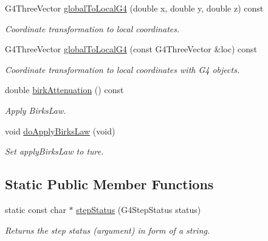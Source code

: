 \begin{DoxyCompactItemize}
G4ThreeVector \hyperlink{class_d_d4hep_1_1_simulation_1_1_geant4_step_handler_ad08f4724ef8345d764de6313d1e121fa}{globalToLocalG4} (double x, double y, double z) const 
\begin{DoxyCompactList}\small\item\em Coordinate transformation to local coordinates. \item\end{DoxyCompactList}\item 
G4ThreeVector \hyperlink{class_d_d4hep_1_1_simulation_1_1_geant4_step_handler_a1a0e03eb5215e033eb98538e6c963d6f}{globalToLocalG4} (const G4ThreeVector \&loc) const 
\begin{DoxyCompactList}\small\item\em Coordinate transformation to local coordinates with G4 objects. \item\end{DoxyCompactList}\item 
double \hyperlink{class_d_d4hep_1_1_simulation_1_1_geant4_step_handler_a35dae8faec24cfac1914db2e73c55bb2}{birkAttenuation} () const 
\begin{DoxyCompactList}\small\item\em Apply BirksLaw. \item\end{DoxyCompactList}\item 
void \hyperlink{class_d_d4hep_1_1_simulation_1_1_geant4_step_handler_a67ef04d7d190e233ae9f3a23d5aedf33}{doApplyBirksLaw} (void)
\begin{DoxyCompactList}\small\item\em Set applyBirksLaw to ture. \item\end{DoxyCompactList}\end{DoxyCompactItemize}
\subsection*{Static Public Member Functions}
\begin{DoxyCompactItemize}
\item 
static const char $\ast$ \hyperlink{class_d_d4hep_1_1_simulation_1_1_geant4_step_handler_a749fffe231a34f253d498edf989ae035}{stepStatus} (G4StepStatus status)
\begin{DoxyCompactList}\small\item\em Returns the step status (argument) in form of a string. \item\end{DoxyCompactList}\end{DoxyCompactItemize}
